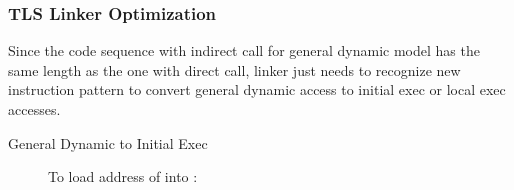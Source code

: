 \subsubsection{TLS Linker Optimization}

Since the code sequence with indirect call for general dynamic model
has the same length as the one with direct call, linker just needs to
recognize new instruction pattern to convert general dynamic access to
initial exec or local exec accesses.

\begin{description}

\item[General Dynamic to Initial Exec]
To load address of  into :

\begin{table}[H]
\Hrule
\caption{GD -> IE Code Transition (LP64)}
\begin{center}
\myfontsize{}
\end{center}
\Hrule
\end{table}

\begin{table}[H]
\Hrule
\caption{GD -> IE Code Transition (ILP32)}
\begin{center}
\myfontsize{}
\end{center}
\Hrule
\end{table}


\end{description}
